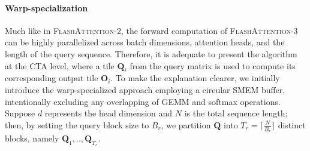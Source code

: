 \paragraph{Warp-specialization}
Much like in \textsc{FlashAttention-2}, the forward computation of \textsc{FlashAttention-3} can be highly parallelized across batch dimensions, attention heads, and the length of the query sequence. Therefore, it is adequate to present the algorithm at the CTA level, where a tile $\mathbf{Q}_i$ from the query matrix is used to compute its corresponding output tile $\mathbf{O}_i$. To make the explanation clearer, we initially introduce the warp-specialized approach employing a circular SMEM buffer, intentionally excluding any overlapping of GEMM and softmax operations. Suppose $d$ represents the head dimension and $N$ is the total sequence length; then, by setting the query block size to $B_r$, we partition $\mathbf{Q}$ into $T_r = \lceil \frac{N}{B_r} \rceil$ distinct blocks, namely $\mathbf{Q}_1, .., \mathbf{Q}_{T_r}$.

